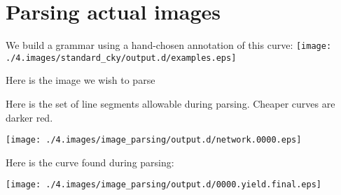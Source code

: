 \section{Parsing actual images}

We build a grammar using a hand-chosen annotation of this curve:
\texttt{[image: ./4.images/standard\_cky/output.d/examples.eps]}

Here is the image we wish to parse

Here is the set of line segments allowable during parsing. Cheaper
curves are darker red.

\texttt{[image: ./4.images/image\_parsing/output.d/network.0000.eps]}

Here is the curve found during parsing:

\texttt{[image: ./4.images/image\_parsing/output.d/0000.yield.final.eps]}
